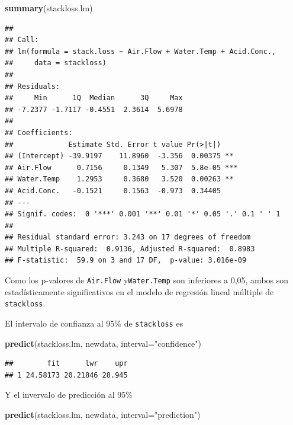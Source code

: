 \documentclass[]{article}
\newenvironment{Shaded}{\begin{snugshade}}{\end{snugshade}}
\newcommand{\KeywordTok}[1]{\textcolor[rgb]{0.13,0.29,0.53}{\textbf{{#1}}}}
\newcommand{\DataTypeTok}[1]{\textcolor[rgb]{0.13,0.29,0.53}{{#1}}}
\newcommand{\StringTok}[1]{\textcolor[rgb]{0.31,0.60,0.02}{{#1}}}
\newcommand{\NormalTok}[1]{{#1}}
\numberwithin{equation}{section}
\begin{document}
\begin{Shaded}
\begin{Highlighting}[]
\KeywordTok{summary}\NormalTok{(stackloss.lm)}
\end{Highlighting}
\end{Shaded}

\begin{verbatim}
## 
## Call:
## lm(formula = stack.loss ~ Air.Flow + Water.Temp + Acid.Conc., 
##     data = stackloss)
## 
## Residuals:
##     Min      1Q  Median      3Q     Max 
## -7.2377 -1.7117 -0.4551  2.3614  5.6978 
## 
## Coefficients:
##             Estimate Std. Error t value Pr(>|t|)    
## (Intercept) -39.9197    11.8960  -3.356  0.00375 ** 
## Air.Flow      0.7156     0.1349   5.307  5.8e-05 ***
## Water.Temp    1.2953     0.3680   3.520  0.00263 ** 
## Acid.Conc.   -0.1521     0.1563  -0.973  0.34405    
## ---
## Signif. codes:  0 '***' 0.001 '**' 0.01 '*' 0.05 '.' 0.1 ' ' 1
## 
## Residual standard error: 3.243 on 17 degrees of freedom
## Multiple R-squared:  0.9136, Adjusted R-squared:  0.8983 
## F-statistic:  59.9 on 3 and 17 DF,  p-value: 3.016e-09
\end{verbatim}

Como los p-valores de \texttt{Air.Flow} y\texttt{Water.Temp} son
inferiores a 0,05, ambos son estadísticamente significativos en el
modelo de regresión lineal múltiple de \texttt{stackloss}.

El intervalo de confianza al 95\% de \texttt{stackloss} es

\begin{Shaded}
\begin{Highlighting}[]
\KeywordTok{predict}\NormalTok{(stackloss.lm, newdata, }\DataTypeTok{interval=}\StringTok{"confidence"}\NormalTok{)}
\end{Highlighting}
\end{Shaded}

\begin{verbatim}
##        fit      lwr    upr
## 1 24.58173 20.21846 28.945
\end{verbatim}

Y el invervalo de predicción al 95\%

\begin{Shaded}
\begin{Highlighting}[]
\KeywordTok{predict}\NormalTok{(stackloss.lm, newdata, }\DataTypeTok{interval=}\StringTok{"prediction"}\NormalTok{)}
\end{Highlighting}
\end{Shaded}
\end{document}
